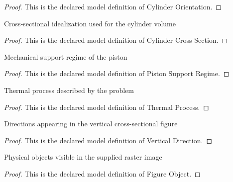 \begin{proof}
  This is the declared model definition of Cylinder Orientation.
\end{proof}
\begin{definition}
  \label{def:physics:phyx-mini-0447:phyxminiproblems-problemphyxmini0447-cylindercrosssection}
  Cross-sectional idealization used for the cylinder volume
\end{definition}
\begin{proof}
  This is the declared model definition of Cylinder Cross Section.
\end{proof}
\begin{definition}
  \label{def:physics:phyx-mini-0447:phyxminiproblems-problemphyxmini0447-pistonsupportregime}
  Mechanical support regime of the piston
\end{definition}
\begin{proof}
  This is the declared model definition of Piston Support Regime.
\end{proof}
\begin{definition}
  \label{def:physics:phyx-mini-0447:phyxminiproblems-problemphyxmini0447-thermalprocess}
  Thermal process described by the problem
\end{definition}
\begin{proof}
  This is the declared model definition of Thermal Process.
\end{proof}
\begin{definition}
  \label{def:physics:phyx-mini-0447:phyxminiproblems-problemphyxmini0447-verticaldirection}
  Directions appearing in the vertical cross-sectional figure
\end{definition}
\begin{proof}
  This is the declared model definition of Vertical Direction.
\end{proof}
\begin{definition}
  \label{def:physics:phyx-mini-0447:phyxminiproblems-problemphyxmini0447-figureobject}
  Physical objects visible in the supplied raster image
\end{definition}
\begin{proof}
  This is the declared model definition of Figure Object.
\end{proof}
